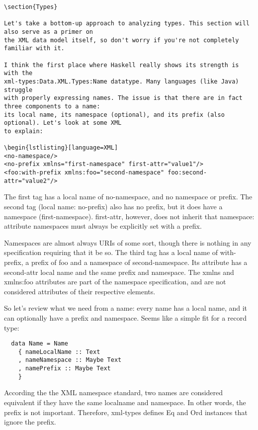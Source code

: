 \begin{lstlisting}
\section{Types}

Let's take a bottom-up approach to analyzing types. This section will also serve as a primer on
the XML data model itself, so don't worry if you're not completely familiar with it.

I think the first place where Haskell really shows its strength is with the
xml-types:Data.XML.Types:Name datatype. Many languages (like Java) struggle
with properly expressing names. The issue is that there are in fact three components to a name:
its local name, its namespace (optional), and its prefix (also optional). Let's look at some XML
to explain:

\begin{lstlisting}[language=XML]
<no-namespace/>
<no-prefix xmlns="first-namespace" first-attr="value1"/>
<foo:with-prefix xmlns:foo="second-namespace" foo:second-attr="value2"/>
\end{lstlisting}

The first tag has a local name of no-namespace, and no
namespace or prefix. The second tag (local name: no-prefix) also has no prefix, 
but it does have a namespace (first-namespace). first-attr, however, does not
inherit that namespace: attribute namespaces must always be explicitly set with a prefix.

Namespaces are almost always URIs of some sort, though there is nothing in any specification
requiring that it be so.
The third tag has a local name of with-prefix, a prefix of
foo and a namespace of second-namespace.
Its attribute has a second-attr local name and the same prefix and namespace.
The xmlns and xmlns:foo attributes are part of the namespace
specification, and are not considered attributes of their respective elements.

So let's review what we need from a name: every name has a local name, and it can optionally
have a prefix and namespace. Seems like a simple fit for a record type:

\begin{lstlisting}
  data Name = Name
    { nameLocalName :: Text
    , nameNamespace :: Maybe Text
    , namePrefix :: Maybe Text
    }
\end{lstlisting}

According the the XML namespace standard, two names are considered equivalent if they
have the same localname and namespace. In other words, the prefix is not important. Therefore,
xml-types defines Eq and Ord instances that
ignore the prefix.

